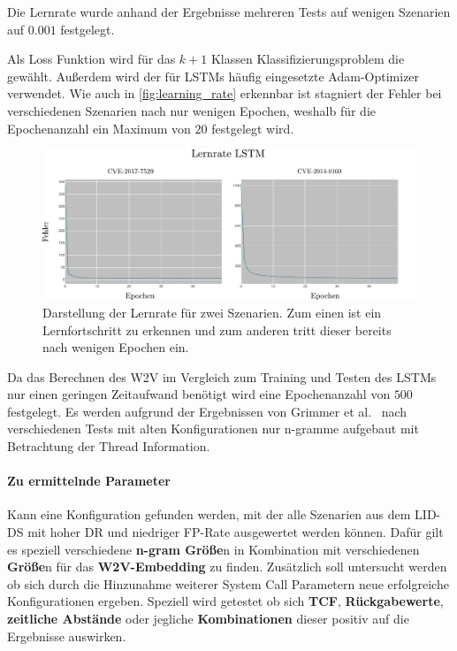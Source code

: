                 Die Lernrate wurde anhand der Ergebnisse mehreren Tests auf wenigen Szenarien auf $0.001$ festgelegt.
                
                Als Loss Funktion wird für das $k+1$ Klassen Klassifizierungsproblem die  gewählt.
                Außerdem wird der für \acp{LSTM} häufig eingesetzte Adam-Optimizer verwendet.
                Wie auch in \autoref{fig:learning_rate} erkennbar ist stagniert der Fehler bei verschiedenen Szenarien nach nur wenigen Epochen, weshalb für die Epochenanzahl ein Maximum von $20$ festgelegt wird.
                \begin{figure}
                    \centering
                    \includegraphics[width=\textwidth]{images/learning_rate.pdf}
                    \caption{Darstellung der Lernrate für zwei Szenarien.
                             Zum einen ist ein Lernfortschritt zu erkennen und zum anderen tritt dieser bereits nach wenigen Epochen ein.}\label{fig:learning_rate}
                \end{figure}

                Da das Berechnen des \ac{W2V} im Vergleich zum Training und Testen des \acp{LSTM} nur einen geringen Zeitaufwand benötigt wird eine Epochenanzahl von $500$ festgelegt. 
                Es werden aufgrund der Ergebnissen von Grimmer et al.~\cite{IDSTHREADGRIMMER2021} nach verschiedenen Tests mit alten Konfigurationen nur n-gramme aufgebaut mit Betrachtung der Thread Information.

            \paragraph{Zu ermittelnde Parameter}
                Kann eine Konfiguration gefunden werden, mit der alle Szenarien aus dem \ac{LID-DS} mit hoher \ac{DR} und niedriger \ac{FP}-Rate ausgewertet werden können.
                Dafür gilt es speziell verschiedene \textbf{n-gram Größe}n in Kombination mit verschiedenen \textbf{Größe}n für das \textbf{\ac{W2V}-Embedding} zu finden.
                Zusätzlich soll untersucht werden ob sich durch die Hinzunahme weiterer System Call Parametern neue erfolgreiche Konfigurationen ergeben.
                Speziell wird getestet ob sich \textbf{\ac{TCF}}, \textbf{Rückgabewerte}, \textbf{zeitliche Abstände} oder jegliche \textbf{Kombinationen} dieser positiv auf die Ergebnisse auswirken.
                
